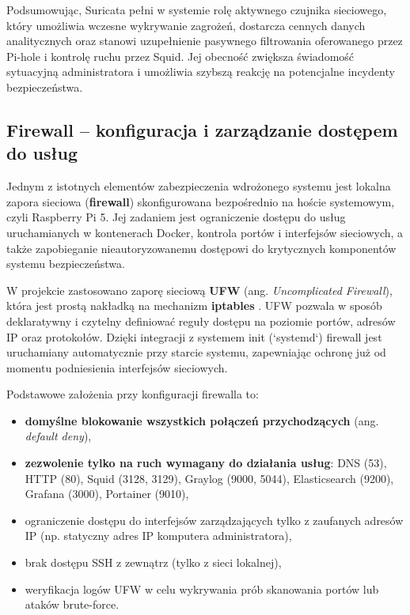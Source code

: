 \documentclass[
    left=2.5cm,         %
    right=2.5cm,        %
    top=2.5cm,          %
    bottom=3cm,         %
    bindingoffset=6mm,  %
    nohyphenation=true %
]{eiti/eiti-thesis} %
\begin{document}
Podsumowując, Suricata pełni w systemie rolę aktywnego czujnika sieciowego, który umożliwia wczesne wykrywanie zagrożeń, dostarcza cennych danych analitycznych oraz stanowi uzupełnienie pasywnego filtrowania oferowanego przez Pi-hole i kontrolę ruchu przez Squid. Jej obecność zwiększa świadomość sytuacyjną administratora i umożliwia szybszą reakcję na potencjalne incydenty bezpieczeństwa.

\subsection{Firewall – konfiguracja i zarządzanie dostępem do usług}

Jednym z istotnych elementów zabezpieczenia wdrożonego systemu jest lokalna zapora sieciowa (\textbf{firewall}) skonfigurowana bezpośrednio na hoście systemowym, czyli Raspberry Pi 5. Jej zadaniem jest ograniczenie dostępu do usług uruchamianych w kontenerach Docker, kontrola portów i interfejsów sieciowych, a także zapobieganie nieautoryzowanemu dostępowi do krytycznych komponentów systemu bezpieczeństwa.

W projekcie zastosowano zaporę sieciową \textbf{UFW} (ang. \textit{Uncomplicated Firewall}), która jest prostą nakładką na mechanizm \textbf{iptables} \cite{ufw-docs}. UFW pozwala w sposób deklaratywny i czytelny definiować reguły dostępu na poziomie portów, adresów IP oraz protokołów. Dzięki integracji z systemem init (`systemd`) firewall jest uruchamiany automatycznie przy starcie systemu, zapewniając ochronę już od momentu podniesienia interfejsów sieciowych.

Podstawowe założenia przy konfiguracji firewalla to:
\begin{itemize}
    \item \textbf{domyślne blokowanie wszystkich połączeń przychodzących} (ang. \textit{default deny}),
    \item \textbf{zezwolenie tylko na ruch wymagany do działania usług}: DNS (53), HTTP (80), Squid (3128, 3129), Graylog (9000, 5044), Elasticsearch (9200), Grafana (3000), Portainer (9010),
    \item ograniczenie dostępu do interfejsów zarządzających tylko z zaufanych adresów IP (np. statyczny adres IP komputera administratora),
    \item brak dostępu SSH z zewnątrz (tylko z sieci lokalnej),
    \item weryfikacja logów UFW w celu wykrywania prób skanowania portów lub ataków brute-force.
\end{itemize}
\end{document}
